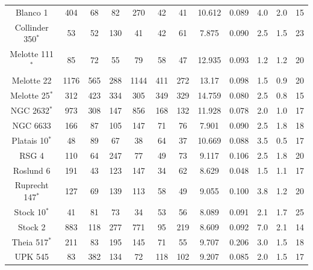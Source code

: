 \documentclass{aa}
\begin{document}
\begin{appendix}
\begin{landscape}
\begin{table}
\begin{tabular}{c c c c c c c c c c c c }
Blanco 1 & 404 & 68 & 82 & 270 & 42 & 41 & 10.612 & 0.089 & 4.0 & 2.0 & 15\\

Collinder 350$^*$ & 53 & 52 & 130 & 41 & 42 & 61 & 7.875 &  0.090  & 2.5 & 1.5 & 23 \\

Melotte 111$^*$ & 85 & 72 & 55 & 79 & 58 & 47 & 12.935   & 0.093 & 1.2 & 1.2 & 20  \\

Melotte 22 & 1176 & 565 & 288 & 1144 & 411 & 272 & 13.17 & 0.098 & 1.5 & 0.9 & 20 \\

Melotte 25$^*$ & 312 & 423 & 334 & 305 & 349 & 329 & 14.759 &0.080 & 2.5 & 0.8 & 15 \\

NGC 2632$^*$ & 973 & 308 & 147 & 856 & 168 & 132 & 11.928 & 0.078 & 2.0 & 1.0 &17\\

NGC 6633 & 166 & 87 & 105 & 147 & 71 & 76 & 7.901 & 0.090 & 2.5 & 1.8 & 18   \\

Platais 10$^*$ & 48 & 89 & 67 & 38 & 64 & 37 & 10.669  & 0.088 & 3.5 & 0.5 & 17\\

RSG 4 & 110 & 64 & 247 & 77 & 49 & 73 & 9.117  & 0.106 & 2.5 & 1.8 & 20\\

Roslund 6 & 191 & 43 & 123 & 147 & 34 & 62 & 8.629 & 0.048 & 1.5 & 1.1 & 17\\

Ruprecht 147$^*$ & 127 & 69 & 139 & 113 & 58 & 49 & 9.055  & 0.100 & 3.8 & 1.2 & 20\\

Stock 10$^*$ & 41 & 81 & 73 & 34 & 53 & 56 & 8.089 & 0.091 & 2.1 & 1.7 & 25\\

Stock 2 & 883 & 118 & 277 & 771 & 95 & 219 & 8.609 & 0.092 & 7.0 & 2.1 & 14\\

Theia 517$^*$ &  211 & 83 & 195 & 145 & 71 & 55 & 9.707 & 0.206 & 3.0 & 1.5 & 18\\

UPK 545 & 83 & 382 & 134 & 72 & 118 & 102 & 9.207 & 0.085 &2.0 & 1.5 & 17\\


\end{tabular}
\end{table}
\end{landscape}
\end{appendix}
\end{document}
